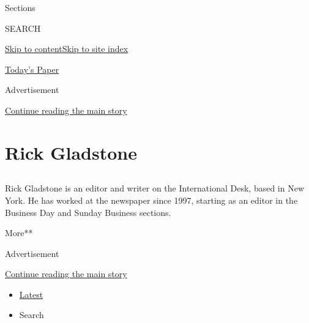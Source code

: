 Sections

SEARCH

\protect\hyperlink{site-content}{Skip to
content}\protect\hyperlink{site-index}{Skip to site index}

\href{https://myaccount.nytimes3xbfgragh.onion/auth/login?response_type=cookie\&client_id=vi}{}

\href{https://www.nytimes3xbfgragh.onion/section/todayspaper}{Today's
Paper}

Advertisement

\protect\hyperlink{after-top}{Continue reading the main story}

\hypertarget{rick-gladstone}{%
\section{Rick Gladstone}\label{rick-gladstone}}

\hypertarget{section}{%
\subsection{}\label{section}}

Rick Gladstone is an editor and writer on the International Desk, based
in New York. He has worked at the newspaper since 1997, starting as an
editor in the Business Day and Sunday Business sections.

More**

Advertisement

\protect\hyperlink{after-mid1}{Continue reading the main story}

\begin{itemize}
\tightlist
\item
  \protect\hyperlink{stream-panel}{Latest}
\item
  Search
\end{itemize}

